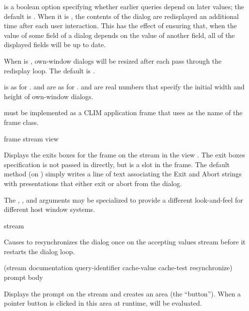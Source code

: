  is a boolean option specifying whether earlier
queries depend on later values; the default is .  When it is
, the contents of the dialog are redisplayed an additional time after
each user interaction.  This has the effect of ensuring that, when the value of
some field of a dialog depends on the value of another field, all of the
displayed fields will be up to date.

When  is , own-window dialogs will be resized after
each pass through the redisplay loop.  The default is .

 is as for .   and 
are as for .   and  are real
numbers that specify the initial width and height of own-window dialogs.



 must be implemented as a CLIM application frame that uses
 as the name of the frame class.


 {frame stream view}

Displays the exits boxes for the  frame  on the
stream  in the view .  The exit boxes specification is not
passed in directly, but is a slot in the frame.  The default method (on
) simply writes a line of text associating the Exit and Abort
strings with presentations that either exit or abort from the dialog.

The , , and  arguments may be specialized to
provide a different look-and-feel for different host window systems.

 {stream}

Causes  to resynchronizes the dialog once on the accepting
values stream  before it restarts the dialog loop.


 {(\optional stream
                                           \key documentation query-identifier
                                                cache-value cache-test resynchronize) 
                                          prompt
                                          \body body}

Displays the prompt  on the stream  and creates an area
(the ``button'').  When a pointer button is clicked in this area at runtime,
 will be evaluated.

